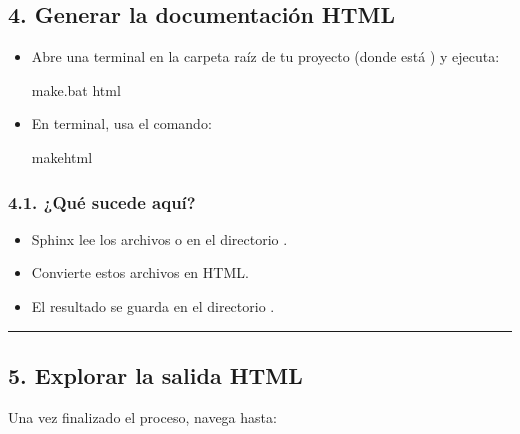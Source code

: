 \documentclass[a4paper,10pt,oneside,spanish,openany]{sphinxmanual}
\begin{document}
\subsection{4. Generar la documentación HTML}
\label{\detokenize{configuracion_inicial/008.Generar_HTML:generar-la-documentacion-html}}\begin{itemize}
\item {} 
\sphinxAtStartPar
{}
Abre una terminal en la carpeta raíz de tu proyecto (donde está ) y ejecuta:

\begin{sphinxVerbatim}[commandchars=\\\{\}]
make.bat html
\end{sphinxVerbatim}

\item {} 
\sphinxAtStartPar
{}
En terminal, usa el comando:

\begin{sphinxVerbatim}[commandchars=\\\{\}]
makehtml
\end{sphinxVerbatim}

\end{itemize}


\subsubsection{4.1. ¿Qué sucede aquí?}
\label{\detokenize{configuracion_inicial/008.Generar_HTML:que-sucede-aqui}}\begin{itemize}
\item {} 
\sphinxAtStartPar
Sphinx lee los archivos  o  en el directorio .

\item {} 
\sphinxAtStartPar
Convierte estos archivos en HTML.

\item {} 
\sphinxAtStartPar
El resultado se guarda en el directorio .

\end{itemize}


\bigskip\hrule\bigskip



\subsection{5. Explorar la salida HTML}
\label{\detokenize{configuracion_inicial/008.Generar_HTML:explorar-la-salida-html}}
\sphinxAtStartPar
Una vez finalizado el proceso, navega hasta:
\end{document}
